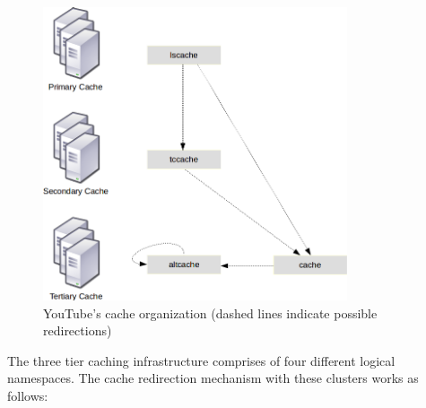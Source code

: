 \begin{figure}[htbp]
  \begin{center}
    \includegraphics[width=0.8\textwidth]{pictures/cache_server.png}
    \caption[YouTube's cache organization]{YouTube's cache organization (dashed lines indicate possible redirections)}
    \label{fig:cache_server}
  \end{center}
\end{figure}

The three tier caching infrastructure comprises of four different logical namespaces. The cache redirection mechanism with these clusters works as follows:

